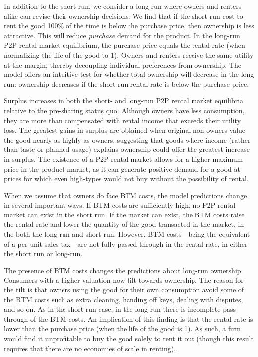 \documentclass[11pt]{article}
\begin{document}
In addition to the short run, we consider a long run where owners and renters alike can revise their ownership decisions.
We find that if the short-run cost to rent the good 100\% of the time is below the purchase price, then ownership is less attractive.
This will reduce \emph{purchase} demand for the product.
In the long-run P2P rental market equilibrium, the purchase price equals the rental rate (when normalizing the life of the good to 1).
Owners and renters receive the same utility at the margin, thereby decoupling individual preferences from ownership. 
The model offers an intuitive test for whether total ownership will decrease in the long run:
ownership decreases if the short-run rental rate is below the purchase price. 

Surplus increases in both the short- and long-run P2P rental market equilibria relative to the pre-sharing status quo.
Although owners have less consumption, they are more than compensated with rental income that exceeds their utility loss. 
The greatest gains in surplus are obtained when original non-owners value the good nearly as highly as owners, suggesting that goods where income (rather than taste or planned usage) explains ownership could offer the greatest increase in surplus. 
The existence of a P2P rental market allows for a higher maximum price in the product market, as it can generate positive demand for a good at prices for which even high-types would not buy without the possibility of rental. 

When we assume that owners do face BTM costs, the model predictions change in several important ways.
If BTM costs are sufficiently high, no P2P rental market can exist in the short run.
If the market can exist, the BTM costs raise the rental rate and lower the quantity of the good transacted in the market, in the both the long run and short run.
However, BTM costs---being the equivalent of a per-unit sales tax---are not fully passed through in the rental rate, in either the short run or long-run.

The presence of BTM costs changes the predictions about long-run ownership.
Consumers with a higher valuation now tilt towards ownership.
The reason for the tilt is that owners using the good for their own consumption avoid some of the BTM costs such as extra cleaning, handing off keys, dealing with disputes, and so on. 
As in the short-run case, in the long run there is incomplete pass through of the BTM costs.
An implication of this finding is that the rental rate is lower than the purchase price (when the life of the good is 1).
As such, a firm would find it unprofitable to buy the good solely to rent it out (though this result requires that there are no economies of scale in renting). 
\end{document}
